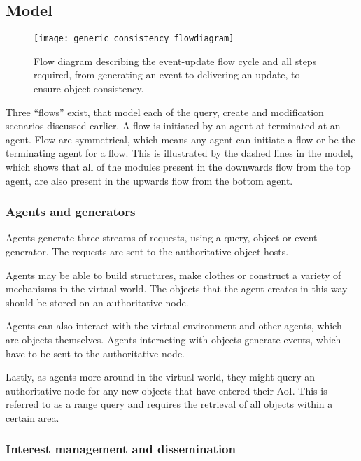 \subsection{Model}

\begin{figure}[htbp]
 \centering
 \texttt{[image: generic\_consistency\_flowdiagram]}
 \caption{Flow diagram describing the event-update flow cycle and all steps required, from generating an event to delivering an update, to ensure object consistency.}
 \label{fig_event_update_flowdiagram}
\end{figure}

Three ``flows'' exist, that model each of the query, create and modification scenarios discussed earlier. A flow is initiated by an agent at terminated at an agent. Flow are symmetrical, which means any agent can initiate a flow or be the terminating agent for a flow. This is illustrated by the dashed lines in the model, which shows that all of the modules present in the downwards flow from the top agent, are also present in the upwards flow from the bottom agent.

\subsubsection{Agents and generators}

Agents generate three streams of requests, using a query, object or event generator. The requests are sent to the authoritative object hosts.

Agents may be able to build structures, make clothes or construct a variety of mechanisms in the virtual world. The objects that the agent creates in this way should be stored on an authoritative node.

Agents can also interact with the virtual environment and other agents, which are objects themselves. Agents interacting with objects generate events, which have to be sent to the authoritative node.

Lastly, as agents more around in the virtual world, they might query an authoritative node for any new objects that have entered their AoI. This is referred to as a range query and requires the retrieval of all objects within a certain area.

\subsubsection{Interest management and dissemination}

